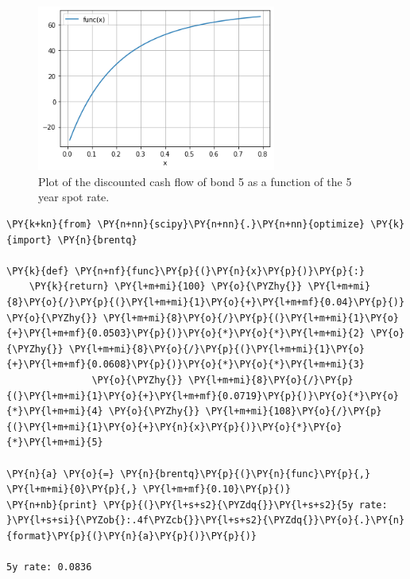 \begin{figure}[htb]
  \centering
  \includegraphics[width=0.7\textwidth]{figures/bond_5_plot.png}
  \caption{Plot of the discounted cash flow of bond 5 as a function of the 5 year spot rate.}
  \label{fig:fifth_year_rate}
\end{figure}

\begin{tcolorbox}[breakable, size=fbox, boxrule=1pt, pad at break*=1mm,colback=cellbackground, colframe=cellborder]
\begin{Verbatim}[commandchars=\\\{\}]
\PY{k+kn}{from} \PY{n+nn}{scipy}\PY{n+nn}{.}\PY{n+nn}{optimize} \PY{k}{import} \PY{n}{brentq}

\PY{k}{def} \PY{n+nf}{func}\PY{p}{(}\PY{n}{x}\PY{p}{)}\PY{p}{:}
    \PY{k}{return} \PY{l+m+mi}{100} \PY{o}{\PYZhy{}} \PY{l+m+mi}{8}\PY{o}{/}\PY{p}{(}\PY{l+m+mi}{1}\PY{o}{+}\PY{l+m+mf}{0.04}\PY{p}{)} \PY{o}{\PYZhy{}} \PY{l+m+mi}{8}\PY{o}{/}\PY{p}{(}\PY{l+m+mi}{1}\PY{o}{+}\PY{l+m+mf}{0.0503}\PY{p}{)}\PY{o}{*}\PY{o}{*}\PY{l+m+mi}{2} \PY{o}{\PYZhy{}} \PY{l+m+mi}{8}\PY{o}{/}\PY{p}{(}\PY{l+m+mi}{1}\PY{o}{+}\PY{l+m+mf}{0.0608}\PY{p}{)}\PY{o}{*}\PY{o}{*}\PY{l+m+mi}{3} 
               \PY{o}{\PYZhy{}} \PY{l+m+mi}{8}\PY{o}{/}\PY{p}{(}\PY{l+m+mi}{1}\PY{o}{+}\PY{l+m+mf}{0.0719}\PY{p}{)}\PY{o}{*}\PY{o}{*}\PY{l+m+mi}{4} \PY{o}{\PYZhy{}} \PY{l+m+mi}{108}\PY{o}{/}\PY{p}{(}\PY{l+m+mi}{1}\PY{o}{+}\PY{n}{x}\PY{p}{)}\PY{o}{*}\PY{o}{*}\PY{l+m+mi}{5}

\PY{n}{a} \PY{o}{=} \PY{n}{brentq}\PY{p}{(}\PY{n}{func}\PY{p}{,} \PY{l+m+mi}{0}\PY{p}{,} \PY{l+m+mf}{0.10}\PY{p}{)}
\PY{n+nb}{print} \PY{p}{(}\PY{l+s+s2}{\PYZdq{}}\PY{l+s+s2}{5y rate: }\PY{l+s+si}{\PYZob{}:.4f\PYZcb{}}\PY{l+s+s2}{\PYZdq{}}\PY{o}{.}\PY{n}{format}\PY{p}{(}\PY{n}{a}\PY{p}{)}\PY{p}{)}

5y rate: 0.0836
\end{Verbatim}
\end{tcolorbox}

